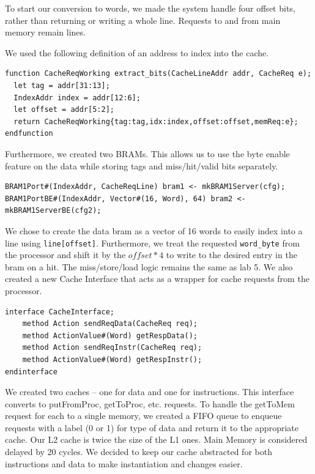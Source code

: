 \documentclass{article}
\begin{document}
To start our conversion to words, we made the system handle four offset bits, rather than returning or writing a whole line. Requests to and from main memory remain lines.

We used the following definition of an address to index into the cache. 
\begin{lstlisting}
function CacheReqWorking extract_bits(CacheLineAddr addr, CacheReq e);
  let tag = addr[31:13];
  IndexAddr index = addr[12:6];
  let offset = addr[5:2];
  return CacheReqWorking{tag:tag,idx:index,offset:offset,memReq:e};
endfunction
\end{lstlisting}
Furthermore, we created two BRAMs. This allows us to use the byte enable feature on the data while storing tags and miss/hit/valid bits separately. 
\begin{lstlisting}
BRAM1Port#(IndexAddr, CacheReqLine) bram1 <- mkBRAM1Server(cfg);
BRAM1PortBE#(IndexAddr, Vector#(16, Word), 64) bram2 <- mkBRAM1ServerBE(cfg2);
\end{lstlisting}

We chose to create the data bram as a vector of 16 words to easily index into a line using \lstinline|line[offset]|. Furthermore, we treat the requested \lstinline{word_byte} from the processor and shift it by the $offset*4$ to write to the desired entry in the bram on a hit.  The miss/store/load logic remains the same as lab 5. We also created a new Cache Interface that acts as a wrapper for cache requests from the processor.

\begin{lstlisting}
interface CacheInterface;
    method Action sendReqData(CacheReq req);
    method ActionValue#(Word) getRespData();
    method Action sendReqInstr(CacheReq req);
    method ActionValue#(Word) getRespInstr();
endinterface
\end{lstlisting}

We created two caches -- one for data and one for instructions. This interface converts to putFromProc, getToProc, etc. requests. To handle the getToMem request for each to a single memory, we created a FIFO queue to enqueue requests with a label (0 or 1) for type of data and return it to the appropriate cache. Our L2 cache is twice the size of the L1 ones. Main Memory is considered delayed by 20 cycles. We decided to keep our cache abstracted for both instructions and data to make instantiation and changes easier.
\end{document}
